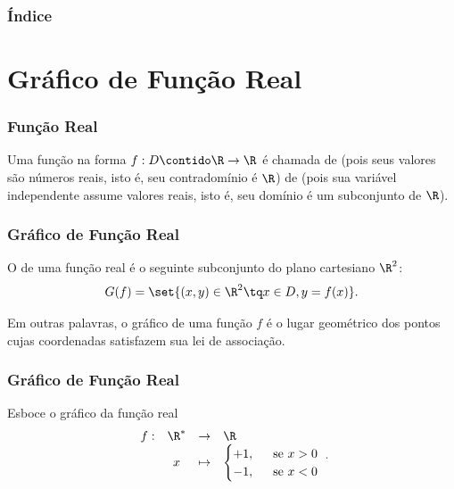 \documentclass[10pt]{beamer}
\begin{document}
	


	{\backgroundimage\begin{frame}[plain]
		\titlepage
	\end{frame}}



	\begin{frame}
		\frametitle{Índice}
		\tableofcontents
	\end{frame}



\section{Gráfico de Função Real}
\begin{frame} \frametitle{Função Real}
\begin{definicao}
Uma função na forma $f : D \contido \R \to \R$ é chamada de
 (pois seus valores são números reais, isto é, seu
contradomínio é $\R$) de  (pois sua variável
independente assume valores reais, isto é, seu domínio é um
subconjunto de $\R$).
\end{definicao}



\end{frame}


\begin{frame}
\frametitle{Gráfico de Função Real} 

\begin{definicao}
O  de uma função real é o seguinte subconjunto do plano
cartesiano $\R^2$: $$G(f) = \set{(x,y) \in \R^2 \tq x \in D , y =
f(x)}.$$
\end{definicao}
Em outras palavras, o gráfico de uma função $f$ é o lugar geométrico
dos pontos cujas coordenadas satisfazem sua lei de associação.

\end{frame}




\begin{frame}
\frametitle{Gráfico de Função Real} 

\begin{exemplo}
Esboce o gráfico da função real
$$\begin{array}{cccl}
f : & \R^\ast & \to     & \R \\
		 &  x & \mapsto & \begin{cases}
												+1,  &  \ \text{ se } x >0 \\
												-1, &  \ \text{ se } x <0
												\end{cases}
\end{array}.$$
\end{exemplo}

\end{frame}
\end{document}
